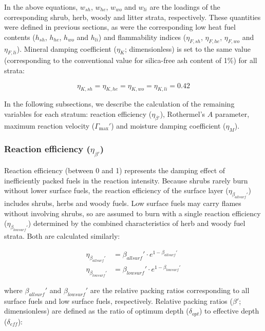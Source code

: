 \documentclass[]{book}
\begin{document}
In the above equations, \(w_{sh}\), \(w_{he}\), \(w_{wo}\) and
\(w_{li}\) are the loadings of the corresponding shrub, herb, woody and
litter strata, respectively. These quantities were defined in previous
sections, as were the corresponding low heat fuel contents (\(h_{sh}\),
\(h_{he}\), \(h_{wo}\) and \(h_{li}\)) and flammability indices
(\(\eta_{F,sh}\), \(\eta_{F,he}\), \(\eta_{F,wo}\) and \(\eta_{F,li}\)).
Mineral damping coefficient (\(\eta_{K}\); dimensionless) is set to the
same value (corresponding to the conventional value for silica-free ash
content of 1\%) for all strata:

\begin{equation}
\eta_{K,sh} = \eta_{K,he} =\eta_{K,wo} = \eta_{K,li} = 0.42
\end{equation}

In the following subsections, we describe the calculation of the
remaining variables for each stratum: reaction efficiency
(\(\eta_{\beta'}\)), Rothermel's \(A\) parameter, maximum reaction
velocity (\(\Gamma_{\max}'\)) and moisture damping coefficient
(\(\eta_{M}\)).

\subsubsection{\texorpdfstring{Reaction efficiency
(\(\eta_{\beta'}\))}{Reaction efficiency (\textbackslash{}eta\_\{\textbackslash{}beta'\})}}\label{reaction-efficiency-eta_beta}

Reaction efficiency (between 0 and 1) represents the damping effect of
inefficiently packed fuels in the reaction intensity. Because shrubs
rarely burn without lower surface fuels, the reaction efficiency of the
surface layer (\(\eta_{\beta_{allsurf}'}\)) includes shrubs, herbs and
woody fuels. Low surface fuels may carry flames without involving
shrubs, so are assumed to burn with a single reaction efficiency
(\(\eta_{\beta_{lowsurf}'}\)) determined by the combined characteristics
of herb and woody fuel strata. Both are calculated similarly:

\begin{eqnarray} 
\eta_{\beta_{allsurf}'} &= \beta_{allsurf}'\cdot e^{1- \beta_{allsurf}'}\\
\eta_{\beta_{lowsurf}'} &=\beta_{lowsurf}'\cdot e^{1- \beta_{lowsurf}'}
\label{eq:reacteff}
\end{eqnarray}

where \(\beta_{allsurf}'\) and \(\beta_{lowsurf}'\) are the relative
packing ratios corresponding to all surface fuels and low surface fuels,
respectively. Relative packing ratios (\(\beta'\); dimensionless) are
defined as the ratio of optimum depth (\(\delta_{opt}\)) to effective
depth (\(\delta_{eff}\)):
\end{document}
